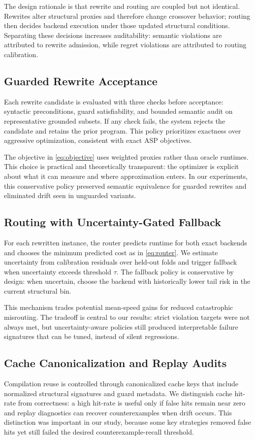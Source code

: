 \documentclass{article} %
\begin{document}
The design rationale is that rewrite and routing are coupled but not identical. Rewrites alter structural proxies and therefore change crossover behavior; routing then decides backend execution under those updated structural conditions. Separating these decisions increases auditability: semantic violations are attributed to rewrite admission, while regret violations are attributed to routing calibration.

\subsection{Guarded Rewrite Acceptance}
Each rewrite candidate is evaluated with three checks before acceptance: syntactic preconditions, guard satisfiability, and bounded semantic audit on representative grounded subsets. If any check fails, the system rejects the candidate and retains the prior program. This policy prioritizes exactness over aggressive optimization, consistent with exact ASP objectives.

The objective in \eqref{eq:objective} uses weighted proxies rather than oracle runtimes. This choice is practical and theoretically transparent: the optimizer is explicit about what it can measure and where approximation enters. In our experiments, this conservative policy preserved semantic equivalence for guarded rewrites and eliminated drift seen in unguarded variants.

\subsection{Routing with Uncertainty-Gated Fallback}
For each rewritten instance, the router predicts runtime for both exact backends and chooses the minimum predicted cost as in \eqref{eq:router}. We estimate uncertainty from calibration residuals over held-out folds and trigger fallback when uncertainty exceeds threshold $\tau$. The fallback policy is conservative by design: when uncertain, choose the backend with historically lower tail risk in the current structural bin.

This mechanism trades potential mean-speed gains for reduced catastrophic misrouting. The tradeoff is central to our results: strict violation targets were not always met, but uncertainty-aware policies still produced interpretable failure signatures that can be tuned, instead of silent regressions.

\subsection{Cache Canonicalization and Replay Audits}
Compilation reuse is controlled through canonicalized cache keys that include normalized structural signatures and guard metadata. We distinguish cache hit-rate from correctness: a high hit-rate is useful only if false hits remain near zero and replay diagnostics can recover counterexamples when drift occurs. This distinction was important in our study, because some key strategies removed false hits yet still failed the desired counterexample-recall threshold.
\end{document}
